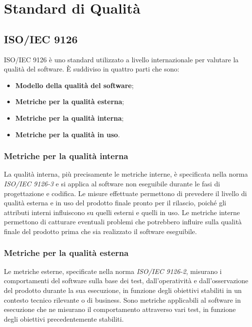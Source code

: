 \appendix
\section{Standard di Qualità}

\subsection{ISO/IEC 9126}
ISO/IEC 9126 è uno standard utilizzato a livello internazionale per valutare la qualità del software.
È suddiviso in quattro parti che sono:
\begin{itemize}
\item \textbf{Modello della qualità del software};
\item \textbf{Metriche per la qualità esterna};
\item \textbf{Metriche per la qualità interna};
\item \textbf{Metriche per la qualità in uso}.
\end{itemize}

\subsubsection{Metriche per la qualità interna}
La qualità interna, più precisamente le metriche interne, è specificata nella norma \textit{ISO/IEC 9126-3} e si applica al software non eseguibile durante le fasi di progettazione e codifica. 
Le misure effettuate permettono di prevedere il livello di qualità esterna e in uso del prodotto finale pronto per il rilascio, poiché gli attributi interni influiscono su quelli esterni e quelli in uso. 
Le metriche interne permettono di catturare eventuali problemi che potrebbero influire sulla qualità finale del prodotto prima che sia realizzato il software eseguibile. 

\subsubsection{Metriche per la qualità esterna}
Le metriche esterne, specificate nella norma \textit{ISO/IEC 9126-2}, misurano i comportamenti del software sulla base dei test, dall'operatività e dall'osservazione del prodotto durante la sua esecuzione, in funzione degli obiettivi stabiliti in un contesto tecnico rilevante o di business. Sono metriche applicabili al software in esecuzione che ne misurano il comportamento attraverso vari test, in funzione degli obiettivi precedentemente stabiliti.

